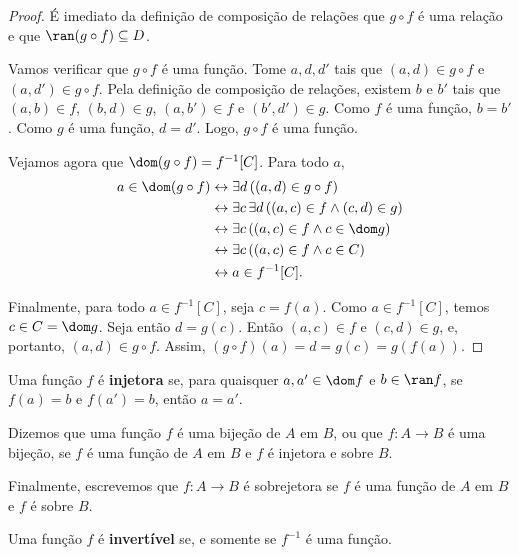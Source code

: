 \begin{proof}
    É imediato da definição de composição de relações que $g\circ f$ é uma relação e que $\ran(g\circ f)\subseteq D$.

    Vamos verificar que $g\circ f$ é uma função.
    Tome $a, d, d'$ tais que $(a, d) \in g\circ f$ e $(a, d') \in g\circ f$.
    Pela definição de composição de relações, existem $b$ e $b'$ tais que $(a, b) \in f$, $(b, d) \in g$, $(a, b') \in f$ e $(b', d') \in g$.
    Como $f$ é uma função, $b = b'$.
    Como $g$ é uma função, $d = d'$.
    Logo, $g\circ f$ é uma função.

    Vejamos agora que $\dom(g\circ f)=f^{-1}[C]$.
    Para todo $a$,
    \[
    \begin{aligned}
        a \in \dom(g\circ f)
        &\leftrightarrow \exists d\,((a,d)\in g\circ f) \\
        &\leftrightarrow \exists c\,\exists d\,((a,c)\in f \land (c,d)\in g) \\
        &\leftrightarrow \exists c\,((a,c)\in f \land c\in \dom g) \\
        &\leftrightarrow \exists c\,((a,c)\in f \land c\in C) \\
        &\leftrightarrow a\in f^{-1}[C].
    \end{aligned}
    \]

    Finalmente, para todo $a \in f^{-1}[C]$, seja $c=f(a)$.
    Como $a\in f^{-1}[C]$, temos $c\in C=\dom g$.
    Seja então $d=g(c)$.
    Então $(a, c) \in f$ e $(c, d) \in g$, e, portanto, $(a, d) \in g\circ f$.
    Assim, $(g\circ f)(a) = d = g(c) = g(f(a))$.
\end{proof}

\begin{definition}[$\BST$]\label{def:injetoraSobrejetoraBijetora}
    Uma função $f$ é \textbf{injetora} se, para quaisquer $a, a' \in \dom f$ e $b \in \ran f$, se $f(a) = b$ e $f(a') = b$, então $a = a'$.

    Dizemos que uma função $f$ é uma bijeção de $A$ em $B$, ou que $f: A \to B$ é uma bijeção, se $f$ é uma função de $A$ em $B$ e $f$ é injetora e sobre $B$.

    Finalmente, escrevemos que $f: A \to B$ é sobrejetora se $f$ é uma função de $A$ em $B$ e $f$ é sobre $B$.
\end{definition}
\begin{definition}[$\BST$]\label{def:invertivel}
    Uma função $f$ é \textbf{invertível} se, e somente se $f^{-1}$ é uma função.
\end{definition}

